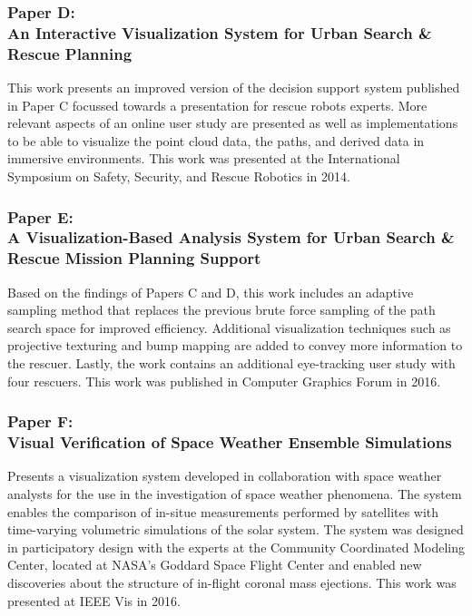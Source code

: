 \subsubsection{Paper D:\\An Interactive Visualization System for Urban Search \& Rescue Planning}
This work presents an improved version of the decision support system published in Paper C focussed towards a presentation for rescue robots experts.  More relevant aspects of an online user study are presented as well as implementations to be able to visualize the point cloud data, the paths, and derived data in immersive environments.  This work was presented at the International Symposium on Safety, Security, and Rescue Robotics in 2014.

\subsubsection{Paper E:\\A Visualization-Based Analysis System for Urban Search \& Rescue Mission Planning Support}
Based on the findings of Papers C and D, this work includes an adaptive sampling method that replaces the previous brute force sampling of the path search space for improved efficiency.  Additional visualization techniques such as projective texturing and bump mapping are added to convey more information to the rescuer.  Lastly, the work contains an additional eye-tracking user study with four rescuers.  This work was published in Computer Graphics Forum in 2016.


\subsubsection{Paper F:\\Visual Verification of Space Weather Ensemble Simulations}
Presents a visualization system developed in collaboration with space weather analysts for the use in the investigation of space weather phenomena.  The system enables the comparison of in-situe measurements performed by satellites with time-varying volumetric simulations of the solar system.  The system was designed in participatory design with the experts at the Community Coordinated Modeling Center, located at NASA's Goddard Space Flight Center and enabled new discoveries about the structure of in-flight coronal mass ejections.  This work was presented at IEEE Vis in 2016.

